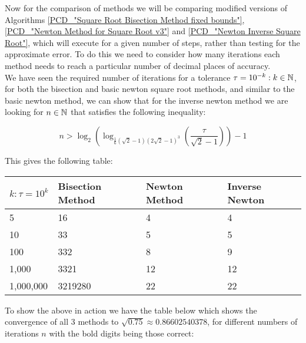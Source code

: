Now for the comparison of methods we will be comparing modified versions of Algorithms \ref{PCD_"Square Root Bisection Method fixed bounds"}, \ref{PCD_"Newton Method for Square Root v3"} and \ref{PCD_"Newton Inverse Square Root"}, which will execute for a given number of steps, rather than testing for the approximate error. To do this we need to consider how many iterations each method needs  to reach a particular number of decimal places of accuracy.\\

We have seen the required number of iterations for a tolerance \(\tau = 10^{-k} : k \in \mathbb{N}\), for both the bisection and basic newton square root methods, and similar to the basic newton method, we can show that for the inverse newton method we are looking for \(n \in \mathbb{N}\) that satisfies the following inequality:

\[n > \log_2\left(\log_{\tfrac{1}{6}(\sqrt{2} - 1)(2\sqrt{2} - 1)^3}\left(\frac{\tau}{\sqrt{2} - 1}\right)\right) - 1\]

This gives the following table:

\begin{center}
\begin{tabular}{|p{3cm}|p{3cm}|p{3cm}|p{3cm}|}
\hline
\(k : \tau = 10^k\) & Bisection Method & Newton Method & Inverse Newton\\\hline
5 & 		16 &		4 &		4\\\hline
10 & 		33 &		5 &		5\\\hline
100 & 		332 &		8 &		9\\\hline
1,000 & 	3321 &		12 &	12\\\hline
1,000,000 & 3219280 &	22 &	22\\\hline
\end{tabular}
\end{center}

To show the above in action we have the table below which shows the convergence of all 3 methods to \(\sqrt{0.75} \approx 0.86602540378\), for different numbers of iterations \(n\) with the bold digits being those correct:

